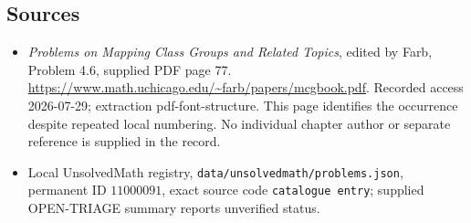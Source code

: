 \documentclass[11pt]{article}
\begin{document}
\subsection{Sources}
\begin{itemize}
\item \emph{Problems on Mapping Class Groups and Related Topics}, edited by Farb, Problem 4.6, supplied PDF page 77. \url{https://www.math.uchicago.edu/~farb/papers/mcgbook.pdf}. Recorded access 2026-07-29; extraction pdf-font-structure. This page identifies the occurrence despite repeated local numbering. No individual chapter author or separate reference is supplied in the record.
\item Local UnsolvedMath registry, \texttt{data/unsolvedmath/problems.json}, permanent ID \(11000091\), exact source code \texttt{catalogue entry}; supplied OPEN-TRIAGE summary reports unverified status.
\end{itemize}
\end{document}
